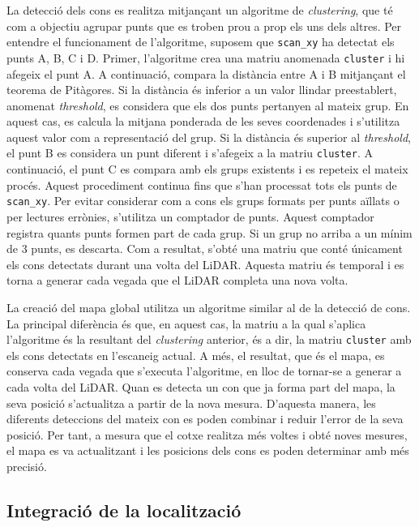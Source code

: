 \documentclass[11pt,a4paper]{article}
\begin{document}
La detecció dels cons es realitza mitjançant un algoritme de \emph{clustering}, que té com a objectiu agrupar punts que es troben prou a prop els uns dels altres. Per entendre el funcionament de l’algoritme, suposem que \texttt{scan\_\allowbreak{}xy} ha detectat els punts A, B, C i D. Primer, l’algoritme crea una matriu anomenada \texttt{cluster} i hi afegeix el punt A. A continuació, compara la distància entre A i B mitjançant el teorema de Pitàgores. Si la distància és inferior a un valor llindar preestablert, anomenat \emph{threshold}, es considera que els dos punts pertanyen al mateix grup. En aquest cas, es calcula la mitjana ponderada de les seves coordenades i s’utilitza aquest valor com a representació del grup. Si la distància és superior al \emph{threshold}, el punt B es considera un punt diferent i s’afegeix a la matriu \texttt{cluster}. A continuació, el punt C es compara amb els grups existents i es repeteix el mateix procés. Aquest procediment continua fins que s’han processat tots els punts de \texttt{scan\_\allowbreak{}xy}. Per evitar considerar com a cons els grups formats per punts aïllats o per lectures errònies, s’utilitza un comptador de punts. Aquest comptador registra quants punts formen part de cada grup. Si un grup no arriba a un mínim de 3 punts, es descarta. Com a resultat, s’obté una matriu que conté únicament els cons detectats durant una volta del LiDAR. Aquesta matriu és temporal i es torna a generar cada vegada que el LiDAR completa una nova volta.

La creació del mapa global utilitza un algoritme similar al de la detecció de cons. La principal diferència és que, en aquest cas, la matriu a la qual s’aplica l’algoritme és la resultant del \emph{clustering} anterior, és a dir, la matriu \texttt{cluster} amb els cons detectats en l’escaneig actual. A més, el resultat, que és el mapa, es conserva cada vegada que s’executa l’algoritme, en lloc de tornar-se a generar a cada volta del LiDAR. Quan es detecta un con que ja forma part del mapa, la seva posició s’actualitza a partir de la nova mesura. D’aquesta manera, les diferents deteccions del mateix con es poden combinar i reduir l’error de la seva posició. Per tant, a mesura que el cotxe realitza més voltes i obté noves mesures, el mapa es va actualitzant i les posicions dels cons es poden determinar amb més precisió.

\subsection{Integració de la localització}\label{sec:integracio-localitzacio}
\end{document}

